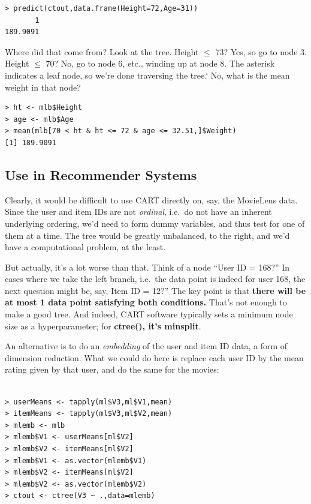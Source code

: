 \begin{lstlisting}
> predict(ctout,data.frame(Height=72,Age=31))
       1 
189.9091 
\end{lstlisting}

Where did that come from?  Look at the tree.  Height $\leq$ 73?  Yes, so
go to node 3.  Height $\leq$ 70?  No, go to node 6, etc., winding up at
node 8.  The asterisk indicates a leaf node, so we're done traversing
the tree.` No, what is the mean weight in that node?

\begin{lstlisting}
> ht <- mlb$Height
> age <- mlb$Age
> mean(mlb[70 < ht & ht <= 72 & age <= 32.51,]$Weight)
[1] 189.9091
\end{lstlisting}

\subsection{Use in Recommender Systems}

Clearly, it would be difficult to use CART directly on, say, the
MovieLens data.  Since the user and item IDs are not \textit{ordinal},
i.e.\ do not have an inherent underlying ordering, we'd need to form
dummy variables, and thus test for one of them at a time.  The tree
would be greatly unbalanced, to the right, and we'd have a computational
problem, at the least.

But actually, it's a lot worse than that.  Think of a node ``User ID =
168?''  In cases where we take the left branch, i.e.\ the data point is
indeed for user 168, the next question might be, say, Item ID = 12?''
The key point is that \textbf{there will be at most 1 data point
satisfying both conditions.}   That's not enough to make a good tree.
And indeed, CART software typically sets a minimum node size as a
hyperparameter; for \textbf{ctree(), it's \textbf{minsplit}}.

An alternative is to do an \textit{embedding} of the user and item ID
data, a form of dimension reduction.  What we could do here is replace
each user ID by the mean rating given by that user, and do the same for
the movies:

\begin{lstlisting}

> userMeans <- tapply(ml$V3,ml$V1,mean) 
> itemMeans <- tapply(ml$V3,ml$V2,mean) 
> mlemb <- mlb
> mlemb$V1 <- userMeans[ml$V2]
> mlemb$V2 <- itemMeans[ml$V2]
> mlemb$V1 <- as.vector(mlemb$V1)
> mlemb$V2 <- itemMeans[ml$V2]
> mlemb$V2 <- as.vector(mlemb$V2)
> ctout <- ctree(V3 ~ .,data=mlemb)

\end{lstlisting}


